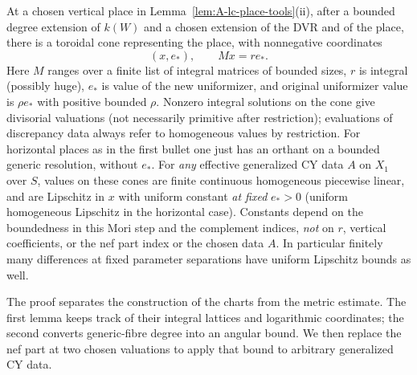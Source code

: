 \begin{proposition}\label{prop:A-uniform-charts}
At a chosen vertical place in Lemma~\ref{lem:A-lc-place-tools}\textup{(ii)},
after a bounded degree extension of \(k(W)\) and a chosen extension of
the DVR and of the place, there is a toroidal cone representing the
place, with nonnegative coordinates
\begin{equation}\label{eq:A-contact-cone}
       (x,e_*),\qquad M x=r e_* .
\end{equation}
Here \(M\) ranges over a finite list of integral matrices of bounded sizes, \(r\) is integral (possibly huge), \(e_*\) is value of the new uniformizer, and original uniformizer value is \(\rho e_*\) with positive bounded \(\rho\).
Nonzero integral solutions on the cone give divisorial valuations (not necessarily primitive after restriction); evaluations of discrepancy data always refer to homogeneous values by restriction.
For horizontal places as in the first bullet one just has an orthant on a bounded generic resolution, without \(e_*\).
For \emph{any} effective generalized CY data \(A\) on \(X_1\) over \(S\), values on these cones are finite continuous homogeneous piecewise linear, and are Lipschitz in \(x\) with uniform constant \emph{at fixed} \(e_*>0\) (uniform homogeneous Lipschitz in the horizontal case).
Constants depend on the boundedness in this Mori step and the complement indices, \emph{not} on \(r\), vertical coefficients, or the nef part index or the chosen data \(A\).
In particular finitely many differences at fixed parameter separations have uniform Lipschitz bounds as well.

\end{proposition}

The proof separates the construction of the charts from the metric
estimate.  The first lemma keeps track of their integral lattices and
logarithmic coordinates; the second converts generic-fibre degree into
an angular bound.  We then replace the nef part at two chosen valuations
to apply that bound to arbitrary generalized CY data.

